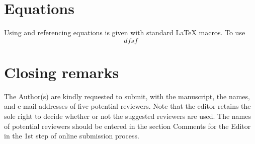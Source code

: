 \documentclass{rog}
\begin{document}
  \section{Equations}
    Using and referencing equations 
    is given with standard \LaTeX{} macros.
    To use
    \begin{equation}
      dfsf
    \end{equation}

    
  \section{Closing remarks}
    The Author(s) are kindly requested to submit, with the manuscript, 
    the names, and e-mail addresses of five potential reviewers. Note 
    that the editor retains the sole right to decide whether or not the 
    suggested reviewers are used. The names of potential reviewers should 
    be entered in the section Comments for the Editor in the 1st step of 
    online submission process.

\end{document}
